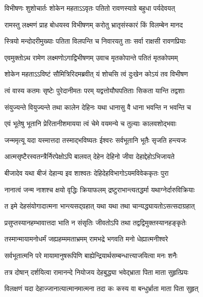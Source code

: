 \twolineshloka
{विभीषणः शुशोचार्तः शोकेन महताऽऽवृतः}
{पतितो रावणस्याग्रे बहुधा पर्यदेवयत्} %

\twolineshloka
{रामस्तु लक्ष्मणं प्राह बोधयस्व विभीषणम्}
{करोतु भ्रातृसंस्कारं किं विलम्बेन मानद} %

\twolineshloka
{स्त्रियो मन्दोदरीमुख्याः पतिता विलपन्ति च}
{निवारयतु ताः सर्वा राक्षसी रावणप्रियाः} %

\twolineshloka
{एवमुक्तोऽथ रामेण लक्ष्मणोऽगाद्विभीषणम्}
{उवाच मृतकोपान्ते पतितं मृतकोपमम्} %

\twolineshloka
{शोकेन महताऽऽविष्टं सौमित्रिरिदमब्रवीत्}
{यं शोचसि त्वं दुःखेन कोऽयं तव विभीषण} %

\twolineshloka
{त्वं वास्य कतमः सृष्टेः पुरेदानीमतः परम्}
{यद्वत्तोयौघपतिताः सिकता यान्ति तद्वशाः} %

\twolineshloka
{संयुज्यन्ते वियुज्यन्ते तथा कालेन देहिनः}
{यथा धानासु वै धाना भवन्ति न भवन्ति च} %

\twolineshloka
{एवं भूतेषु भूतानि प्रेरितानीशमायया}
{त्वं चेमे वयमन्ये च तुल्याः कालवशोद्भवाः} %

\twolineshloka
{जन्ममृत्यू यदा यस्मात्तदा तस्माद्भविष्यतः}
{ईश्वरः सर्वभूतानि भूतैः सृजति हन्त्यजः} %

\twolineshloka
{आत्मसृष्टैरस्वतन्त्रैर्निरपेक्षोऽपि बालवत्}
{देहेन देहिनो जीवा देहाद्देहोऽभिजायते} %

\twolineshloka
{बीजादेव यथा बीजं देहान्य इव शाश्वतः}
{देहिदेहविभागोऽयमविवेककृतः पुरा} %

\twolineshloka
{नानात्वं जन्म नाशश्च क्षयो वृद्धिः क्रियाफलम्}
{द्रष्टुराभान्त्यतद्धर्मा यथाग्नेर्दारुविक्रियाः} %

\twolineshloka
{त इमे देहसंयोगादात्मना भान्त्यसद्ग्रहात्}
{यथा यथा तथा चान्यद्ध्यायतोऽसत्सदाग्रहात्} %

\twolineshloka
{प्रसुप्तस्यानहम्भावात्तदा भाति न संसृतिः}
{जीवतोऽपि तथा तद्वद्विमुक्तस्यानहङ्कृतेः} %

\twolineshloka
{तस्मान्मायामनोधर्मं जह्यहम्ममताभ्रमम्}
{रामभद्रे भगवति मनो धेह्यात्मनीश्वरे} %

\twolineshloka
{सर्वभूतात्मनि परे मायामानुषरूपिणि}
{बाह्येन्द्रियार्थसम्बन्धात्त्याजयित्वा मनः शनैः} %

\twolineshloka
{तत्र दोषान् दर्शयित्वा रामानन्दे नियोजय}
{देहबुद्ध्या भवेद्भ्राता पिता माता सुहृत्प्रियः} %

\twolineshloka
{विलक्षणं यदा देहाज्जानात्यात्मानमात्मना}
{तदा कः कस्य वा बन्धुर्भ्राता माता पिता सुहृत्} %

